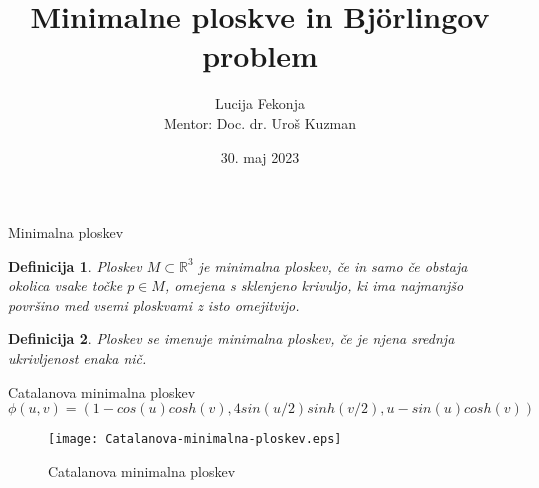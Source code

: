 \documentclass{beamer}
\title{Minimalne ploskve in Björlingov problem}
\author{Lucija Fekonja \\
Mentor: Doc. dr. Uroš Kuzman}
\institute{Fakulteta za matematiko in fiziko \\
Oddelek za matematiko}
\date{30. maj 2023}
\newtheorem{definicija}{Definicija}
\begin{document}
    \begin{frame}
        \titlepage
    \end{frame}


    \begin{frame}{Minimalna ploskev}
        \begin{definicija}
            Ploskev $M \subset \mathbb{R}^3$ je \emph{minimalna ploskev}, če in samo če obstaja okolica vsake točke $p \in M$, omejena s 
            sklenjeno krivuljo, ki ima najmanjšo površino med vsemi ploskvami z isto omejitvijo.
        \end{definicija}

        \pause

        \begin{definicija}
            Ploskev se imenuje \emph{minimalna ploskev}, če je njena srednja ukrivljenost enaka nič.
        \end{definicija}
    \end{frame}


    \begin{frame}{Catalanova minimalna ploskev}
        $$\phi (u, v) = \left( 1 - cos (u) cosh (v), 4 sin(u/2) sinh(v/2), u - sin (u) cosh (v) \right)$$

        \begin{figure}[h]
            \texttt{[image: Catalanova-minimalna-ploskev.eps]}
            \caption{Catalanova minimalna ploskev}
        \end{figure}
    \end{frame}
    
\end{document}
